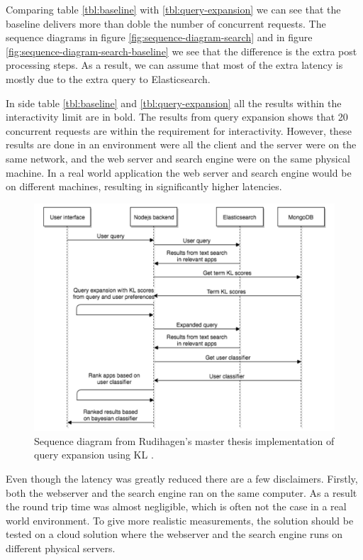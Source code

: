 Comparing table \ref{tbl:baseline} with \ref{tbl:query-expansion} we can see that the baseline delivers more than doble the number of concurrent requests.
The sequence diagrams in figure \ref{fig:sequence-diagram-search} and in figure \ref{fig:sequence-diagram-search-baseline} we see that the difference is the extra post processing steps.
As a result, we can assume that most of the extra latency is mostly due to the extra query to Elasticsearch.

In side table \ref{tbl:baseline} and \ref{tbl:query-expansion} all the results within the interactivity limit are in bold.
The results from query expansion shows that 20 concurrent requests are within the requirement for interactivity.
However, these results are done in an environment were all the client and the server were on the same network,
and the web server and search engine were on the same physical machine.
In a real world application the web server and search engine would be on different machines,
resulting in significantly higher latencies.

\begin{figure}[h!]
\centering \includegraphics[width=0.9\linewidth]{img/sequence-diagram-search-master-thesis.png}
\caption{Sequence diagram from Rudihagen's master thesis implementation of query expansion using KL \cite[p. 37]{master-thesis}.}
\label{fig:sequence-diagram-search-master}
\end{figure}

Even though the latency was greatly reduced there are a few disclaimers.
Firstly, both the webserver and the search engine ran on the same computer.
As a result the round trip time was almost negligible, which is often not the case in a real world environment.
To give more realistic measurements, the solution should be tested on a cloud solution where the webserver and the search engine runs on different physical servers.

